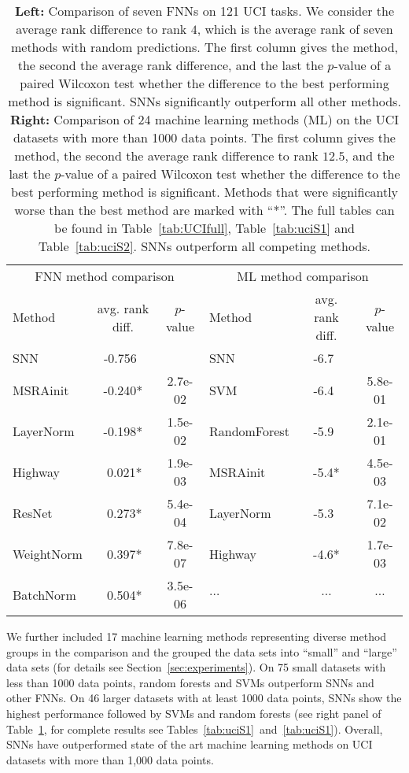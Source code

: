 \documentclass{article}
\begin{document}
\begin{table}[htp]
\caption[Comparison of seven FNNs on 121 UCI tasks]{{\bf Left:} Comparison of seven FNNs on 121 UCI tasks. 
We consider the average rank difference to rank $4$, which is
the average rank of seven methods with random predictions. 
The first column gives the method, the second 
the average rank difference, and the last the $p$-value 
of a paired Wilcoxon test whether the difference to the best performing 
method is significant.
SNNs significantly outperform all other methods.
{\bf Right:} Comparison of 24 machine learning methods (ML) on the UCI datasets
with more than 1000 data points. 
The first column gives the method, the second 
the average rank difference to rank $12.5$, and the last the $p$-value 
of a paired Wilcoxon test whether the difference to the best performing 
method is significant. Methods that were significantly worse than
the best method are marked with ``*''.
The full tables can be found in Table~\ref{tab:UCIfull}, Table~\ref{tab:uciS1} and Table~\ref{tab:uciS2}.
SNNs outperform all competing methods. 
\label{tab:uci} \label{tab:uci2}}
\centering
\begin{tabular}{lcclcc}
  \toprule
\multicolumn{3}{c}{FNN method comparison}   &  \multicolumn{3}{c}{ML method comparison} \\
 Method      & avg. rank diff. & $p$-value  & Method  &  avg. rank diff. & $p$-value \\ 
    \midrule
SNN         & -0.756$\ \ $ &  &  SNN &  -6.7$\ \ $  &  \\ 
MSRAinit    & -0.240* &    { 2.7e-02}  & SVM  &  -6.4$\ \ $  &  5.8e-01 \\ 
LayerNorm   & -0.198*  &    { 1.5e-02} &  RandomForest &  -5.9$\ \ $  &  2.1e-01 \\ 
Highway     & $\  $0.021*  &    { 1.9e-03} &  MSRAinit &  -5.4* &  { 4.5e-03} \\ 
ResNet      & $\  $0.273* &    { 5.4e-04} &  LayerNorm &  -5.3$\ \ $  &  7.1e-02 \\ 
WeightNorm  & $\  $0.397* &    { 7.8e-07} &  Highway &  -4.6* &  { 1.7e-03} \\ 
BatchNorm   & $\  $0.504* &    { 3.5e-06} &  $\ldots$ &   $\ldots$ &  $\ldots$ \\ 
\bottomrule
\end{tabular}
\end{table}

We further included 17 machine learning methods representing diverse method groups \citep{bib:Fernandez2014} 
in the comparison and 
the grouped the data sets into ``small'' and ``large'' data sets (for details see Section~\ref{sec:experiments}).
On 75 small datasets with less than 1000 data points, random forests and SVMs outperform SNNs and other FNNs. 
On 46 larger datasets with at least 1000 data points, 
SNNs show the highest performance followed by SVMs and random forests (see right panel of Table~\ref{tab:uci2},
for complete results see Tables~\ref{tab:uciS1}~and~\ref{tab:uciS1}).
Overall, SNNs have outperformed state of the art machine learning methods on UCI datasets
with more than 1,000 data points.
\end{document}
